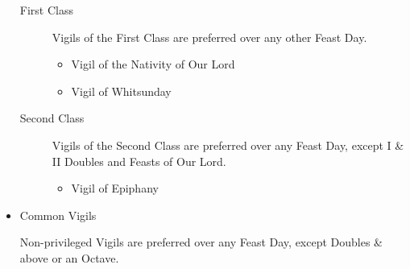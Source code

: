 \begin{itemize}
\begin{description}
            \item[First Class] Vigils of the First Class are preferred over any other Feast Day.
                \begin{itemize}
                    \item Vigil of the Nativity of Our Lord
                    \item Vigil of Whitsunday
                \end{itemize}
            \item[Second Class] Vigils of the Second Class are preferred over any Feast Day, except I \& II Doubles and Feasts of Our Lord.
                \begin{itemize}
                    \item Vigil of Epiphany
                \end{itemize}
        \end{description}
    \item Common Vigils\par
        Non-privileged Vigils are preferred over any Feast Day, except Doubles \& above or an Octave.
\end{itemize}

%
